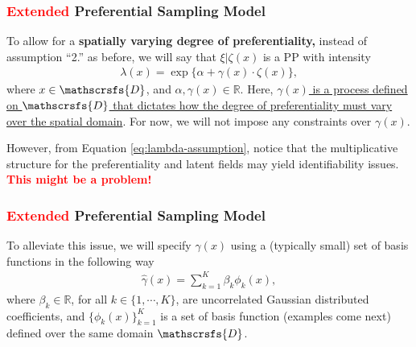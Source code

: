 \documentclass[10pt, aspectratio = 169, handout]{beamer} %
\let\oldtextbf\textbf
\renewcommand\textbf[1]{\textcolor{titles}{\oldtextbf{#1}}}
\begin{document}
	  \begin{frame}[t]
		\frametitle{\textcolor{red}{Extended} Preferential Sampling Model}
		\justifying

        To allow for a \textbf{spatially varying degree of preferentiality,} instead of assumption ``2.'' as before, we will say that $\xi|\zeta(x)$ is a PP with intensity 
        \begin{align} \label{eq:lambda-assumption}
            \lambda(x) = \exp\{\alpha + \gamma(x) \cdot \zeta(x)\},
        \end{align}
        where $x \in \mathscrsfs{D}$, and $\alpha, \gamma(x) \in \mathbb{R}$. Here, \ul{$\gamma(x)$ is a process defined on $\mathscrsfs{D}$ that dictates how the degree of preferentiality must vary over the spatial domain}. For now, we will not impose any constraints over $\gamma(x)$.  \vspace{12pt}

        \pause

        However, from Equation \eqref{eq:lambda-assumption}, notice that the multiplicative structure for the preferentiality and latent fields may yield identifiability issues. \textbf{\textcolor{red}{This might be a problem!}}
	\end{frame}

	  \begin{frame}[t]
		\frametitle{\textcolor{red}{Extended} Preferential Sampling Model}
		\justifying

        To alleviate this issue, we will specify $\gamma(x)$ using a (typically small)  set of basis functions in the following way
        \begin{align*}
            \hat{\gamma}(x) = \sum_{k = 1}^{K}\beta_k \phi_k(x),
        \end{align*}
        where $\beta_k \in \mathbb{R}$, for all $k \in \{1, \cdots, K\}$, are uncorrelated Gaussian distributed coefficients, and $\{\phi_k(x)\}_{k = 1}^K$ is a set of basis function (examples come next) defined over the same domain\hspace{-1pt} $\mathscrsfs{D}$. 
        
	\end{frame}
\end{document}
